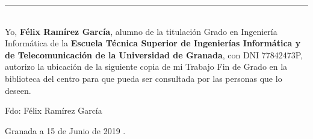 \noindent\rule[-1ex]{\textwidth}{2pt}\\[4.5ex]

Yo, \textbf{Félix Ramírez García}, alumno de la titulación Grado en Ingeniería Informática de la \textbf{Escuela Técnica Superior
de Ingenierías Informática y de Telecomunicación de la Universidad de Granada}, con DNI 77842473P, autorizo la
ubicación de la siguiente copia de mi Trabajo Fin de Grado en la biblioteca del centro para que pueda ser
consultada por las personas que lo deseen.

\vspace{6cm}

\begin{flushright}
	\noindent Fdo: Félix Ramírez García
\end{flushright}

\begin{flushright}
	Granada a 15 de Junio de 2019 .
\end{flushright}

\newpage %
